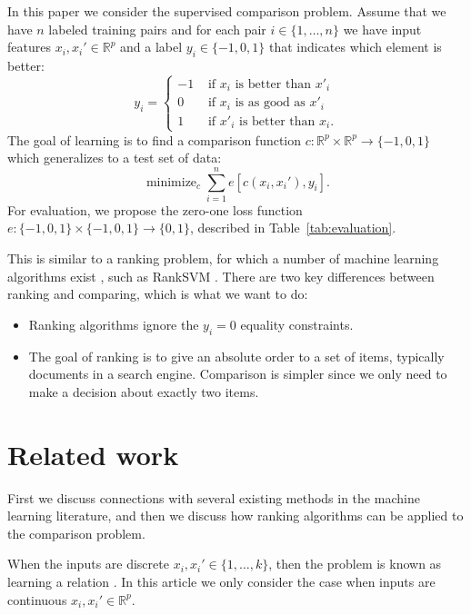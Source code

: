 \documentclass{article}
\newcommand{\RR}{\mathbb R}
\DeclareMathOperator*{\minimize}{minimize}
\begin{document}
In this paper we consider the supervised comparison problem. Assume
that we have $n$ labeled training pairs and for each pair
$i\in\{1,\dots,n\}$ we have input features $x_i,x_i'\in\RR^p$ and a
label $y_i\in\{-1,0,1\}$ that indicates which element is better:
\begin{equation}
  \label{eq:z}
  y_i =
  \begin{cases}
    -1 & \text{ if $x_i$ is better than $x'_i$}\\
    0 & \text{ if $x_i$ is as good as $x'_i$}\\
    1 & \text{ if $x'_i$ is better than $x_i$}.
  \end{cases}
\end{equation}
The goal of learning is to find a comparison function $c:\RR^p \times
\RR^p \rightarrow \{-1,0,1\}$ which generalizes to a test set of data:
\begin{equation}
  \minimize_{c} 
  \sum_{i=1}^n
  e\left[ c(x_i, x_i'), y_i \right].
\end{equation}
For evaluation, we propose the zero-one loss function
$e:\{-1,0,1\}\times\{-1,0,1\}\rightarrow\{0,1\}$, described in
Table~\ref{tab:evaluation}.

This is similar to a ranking problem, for which a number of machine
learning algorithms exist \citep{learning-to-rank}, such as RankSVM
\citep{ranksvm}. There are two key differences between ranking and
comparing, which is what we want to do:
\begin{itemize}
\item Ranking algorithms ignore the $y_i=0$ equality constraints.
\item The goal of ranking is to give an absolute order to a set of
  items, typically documents in a search engine. Comparison is simpler
  since we only need to make a decision about exactly two items.
\end{itemize}

\section{Related work}
\label{sec:related}

First we discuss connections with several existing methods in the
machine learning literature, and then we discuss how ranking
algorithms can be applied to the comparison problem.

When the inputs are discrete $x_i,x_i'\in\{1,\dots,k\}$, then the
problem is known as learning a relation \citep{relations}. In this
article we only consider the case when inputs are continuous
$x_i,x_i'\in\RR^p$.
\end{document}
